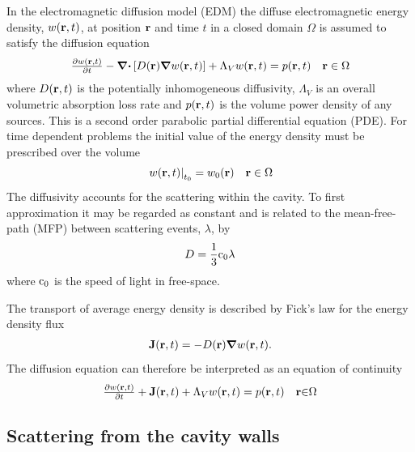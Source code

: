 \documentclass[a4paper]{article}
\numberwithin{equation}{section}
\begin{document}
In the electromagnetic diffusion model (EDM) the diffuse electromagnetic energy
density, $w(\boldsymbol{\mathrm{r}},t)$, at position $\boldsymbol{\mathrm{r}}$ and time $t$ in a closed
domain $\Omega$ is assumed to satisfy the diffusion equation
\begin{align}
\begin{matrix}
\frac{\partial w(\boldsymbol{\mathrm{r}},t)}{\partial t} - \boldsymbol{\mathrm{\nabla}}\boldsymbol{\mathrm{\cdot}}\left[D(\boldsymbol{\mathrm{r}}) \boldsymbol{\mathrm{\nabla}} w(\boldsymbol{\mathrm{r}},t) \right] + \Lambda_V w(\boldsymbol{\mathrm{r}},t) = p(\boldsymbol{\mathrm{r}},t) &\boldsymbol{\mathrm{r}}\in\Omega 
\end{matrix}
\end{align}
where $D(\boldsymbol{\mathrm{r}},t)$ is the potentially inhomogeneous diffusivity, $\Lambda_V$ is an 
overall volumetric absorption loss rate and  $p(\boldsymbol{\mathrm{r}},t)$ is the volume power density 
of any sources. This is a second order parabolic partial differential equation (PDE).
For time dependent problems the initial value of the energy density must be
prescribed over the volume
\begin{align}
\begin{matrix}
\left.w(\boldsymbol{\mathrm{r}},t)\right|_{t_0} = w_0(\boldsymbol{\mathrm{r}}) &\boldsymbol{\mathrm{r}}\in\Omega
\end{matrix}
\end{align}
The diffusivity accounts for the scattering within the cavity. To first
approximation it may be regarded as constant and is related to the
mean-free-path (MFP) between scattering events, $\lambda$, by
\begin{align}
D = \frac{1}{3}\mathrm{c}_0\lambda 
\end{align}
where $\mathrm{c}_0$ is the speed of light in free-space. 

The transport of average energy density is described by Fick’s law for the
energy density flux
\begin{align}
\boldsymbol{\mathrm{J}}(\boldsymbol{\mathrm{r}},t) = -D(\boldsymbol{\mathrm{r}})\boldsymbol{\mathrm{\nabla}} w(\boldsymbol{\mathrm{r}},t) .
\end{align}
The diffusion equation can therefore be interpreted as an equation of continuity
\begin{align}
\begin{matrix}
\frac{\partial w(\boldsymbol{\mathrm{r}},t)}{\partial t} +\boldsymbol{\mathrm{J}}(\boldsymbol{\mathrm{r}},t) + \Lambda_V w(\boldsymbol{\mathrm{r}},t)= p(\boldsymbol{\mathrm{r}},t) &\boldsymbol{\mathrm{r}}{\in}\Omega
\end{matrix}
\end{align}

\subsection[Scattering from the cavity walls]{Scattering from the cavity walls}
\label{sc:sum:walls}
\end{document}
